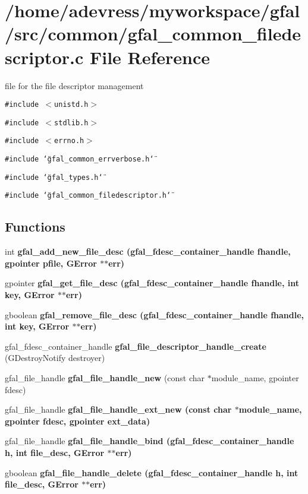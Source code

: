 \section{/home/adevress/myworkspace/gfal/src/common/gfal\_\-common\_\-filedescriptor.c File Reference}
\label{gfal__common__filedescriptor_8c}
file for the file descriptor management 

{\tt \#include $<$unistd.h$>$}\par
{\tt \#include $<$stdlib.h$>$}\par
{\tt \#include $<$errno.h$>$}\par
{\tt \#include \char`\"{}gfal\_\-common\_\-errverbose.h\char`\"{}}\par
{\tt \#include \char`\"{}gfal\_\-types.h\char`\"{}}\par
{\tt \#include \char`\"{}gfal\_\-common\_\-filedescriptor.h\char`\"{}}\par
\subsection*{Functions}
\begin{CompactItemize}
\item 
int \bf{gfal\_\-add\_\-new\_\-file\_\-desc} (gfal\_\-fdesc\_\-container\_\-handle fhandle, gpointer pfile, GError $\ast$$\ast$err)
\item 
gpointer \bf{gfal\_\-get\_\-file\_\-desc} (gfal\_\-fdesc\_\-container\_\-handle fhandle, int key, GError $\ast$$\ast$err)
\item 
gboolean \bf{gfal\_\-remove\_\-file\_\-desc} (gfal\_\-fdesc\_\-container\_\-handle fhandle, int key, GError $\ast$$\ast$err)
\item 
gfal\_\-fdesc\_\-container\_\-handle \textbf{gfal\_\-file\_\-descriptor\_\-handle\_\-create} (GDestroy\-Notify destroyer)\label{gfal__common__filedescriptor_8c_13934d51ad328aabb0721ef7793ad233}

\item 
gfal\_\-file\_\-handle \textbf{gfal\_\-file\_\-handle\_\-new} (const char $\ast$module\_\-name, gpointer fdesc)\label{gfal__common__filedescriptor_8c_5891a96d47726421216140dba73f5e27}

\item 
gfal\_\-file\_\-handle \bf{gfal\_\-file\_\-handle\_\-ext\_\-new} (const char $\ast$module\_\-name, gpointer fdesc, gpointer ext\_\-data)
\item 
gfal\_\-file\_\-handle \bf{gfal\_\-file\_\-handle\_\-bind} (gfal\_\-fdesc\_\-container\_\-handle h, int file\_\-desc, GError $\ast$$\ast$err)
\item 
gboolean \bf{gfal\_\-file\_\-handle\_\-delete} (gfal\_\-fdesc\_\-container\_\-handle h, int file\_\-desc, GError $\ast$$\ast$err)
\end{CompactItemize}


